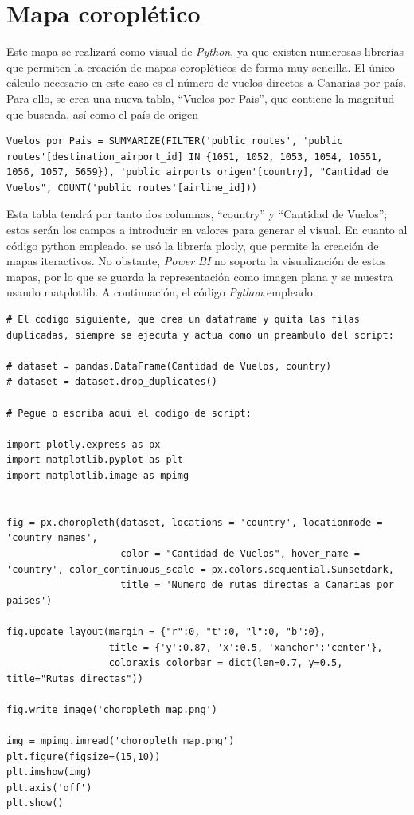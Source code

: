 \documentclass[11pt]{opticajnl}
\begin{document}
\section{Mapa coroplético}

Este mapa se realizará como visual de \textit{Python}, ya que existen numerosas librerías que permiten la creación de mapas coropléticos de forma muy sencilla. El único cálculo necesario en este caso es el número de vuelos directos a Canarias por país. Para ello, se crea una nueva tabla, ``Vuelos por Pais'', que contiene la magnitud que buscada, así como el país de origen 
\begin{lstlisting}[style=terminal]
Vuelos por Pais = SUMMARIZE(FILTER('public routes', 'public routes'[destination_airport_id] IN {1051, 1052, 1053, 1054, 10551, 1056, 1057, 5659}), 'public airports origen'[country], "Cantidad de Vuelos", COUNT('public routes'[airline_id]))
\end{lstlisting}

Esta tabla tendrá por tanto dos columnas, ``country'' y ``Cantidad de Vuelos''; estos serán los campos a introducir en valores para generar el visual. En cuanto al código python empleado, se usó la librería plotly, que permite la creación de mapas iteractivos. No obstante, \textit{Power BI} no soporta la visualización de estos mapas, por lo que se guarda la representación como imagen plana y se muestra usando matplotlib. A continuación, el código \textit{Python} empleado: 
\begin{lstlisting}[style=python]  
# El codigo siguiente, que crea un dataframe y quita las filas duplicadas, siempre se ejecuta y actua como un preambulo del script:

# dataset = pandas.DataFrame(Cantidad de Vuelos, country)
# dataset = dataset.drop_duplicates()

# Pegue o escriba aqui el codigo de script:

import plotly.express as px
import matplotlib.pyplot as plt
import matplotlib.image as mpimg


fig = px.choropleth(dataset, locations = 'country', locationmode = 'country names',
                    color = "Cantidad de Vuelos", hover_name = 'country', color_continuous_scale = px.colors.sequential.Sunsetdark,
                    title = 'Numero de rutas directas a Canarias por paises')

fig.update_layout(margin = {"r":0, "t":0, "l":0, "b":0},
                  title = {'y':0.87, 'x':0.5, 'xanchor':'center'},
                  coloraxis_colorbar = dict(len=0.7, y=0.5, title="Rutas directas"))

fig.write_image('choropleth_map.png')

img = mpimg.imread('choropleth_map.png')
plt.figure(figsize=(15,10))
plt.imshow(img)
plt.axis('off')
plt.show()
\end{lstlisting}
\end{document}
